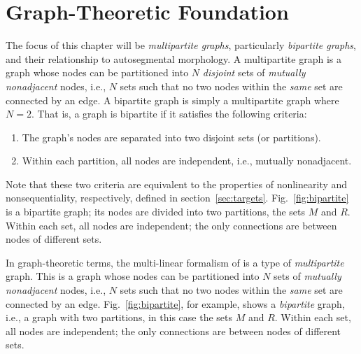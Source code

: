 \chapter{Graph-Theoretic Foundation}
\label{ch:graph}
The focus of this chapter will be \emph{multipartite graphs}, 
particularly \emph{bipartite graphs}, and their relationship 
to autosegmental morphology.
A multipartite graph is a graph 
whose nodes can be partitioned into $N$ \emph{disjoint} sets of 
\emph{mutually nonadjacent} nodes, i.e., $N$ sets such that no two
nodes within the \emph{same} set are connected by an edge. A bipartite graph
is simply a multipartite graph where $N = 2$. That is, a graph is bipartite if it satisfies the following
criteria:
\begin{enumerate}
\item The graph's nodes are separated into two disjoint sets (or partitions).
\item Within each partition, all nodes are independent, i.e., mutually nonadjacent.
\end{enumerate}
Note that these two criteria are equivalent to the properties of nonlinearity and 
nonsequentiality, respectively, defined in section~\ref{sec:targets}.
Fig.~\ref{fig:bipartite} is a bipartite
graph; its nodes are divided into two partitions, the sets $M$
and $R$. Within each set, all nodes are independent; 
the only connections are between nodes of different sets.

In graph-theoretic terms, the multi-linear formalism of
\cite{mccarthy:1981} is a type of \emph{multipartite}
graph. This is a graph whose nodes can be partitioned into $N$ sets of
\emph{mutually nonadjacent} nodes, i.e., $N$ sets such that no two
nodes within the \emph{same} set are connected by an edge. %
Fig.~\ref{fig:bipartite}, for example, shows a \emph{bipartite}
graph, i.e., a graph with two partitions, in this case the sets $M$
and $R$.
Within each set, all nodes are independent; the only connections are between nodes of different sets.

